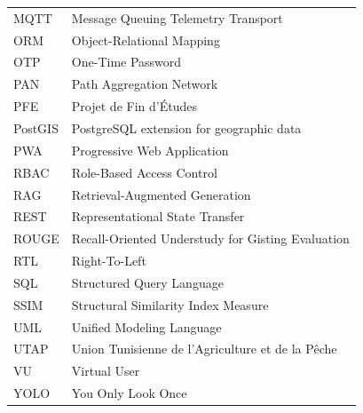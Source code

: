 \begin{longtable}{lp{10cm}}
MQTT & Message Queuing Telemetry Transport \\
ORM & Object-Relational Mapping \\
OTP & One-Time Password \\
PAN & Path Aggregation Network \\
PFE & Projet de Fin d'Études \\
PostGIS & PostgreSQL extension for geographic data \\
PWA & Progressive Web Application \\
RBAC & Role-Based Access Control \\
RAG & Retrieval-Augmented Generation \\
REST & Representational State Transfer \\
ROUGE & Recall-Oriented Understudy for Gisting Evaluation \\
RTL & Right-To-Left \\
SQL & Structured Query Language \\
SSIM & Structural Similarity Index Measure \\
UML & Unified Modeling Language \\
UTAP & Union Tunisienne de l'Agriculture et de la Pêche \\
VU & Virtual User \\
YOLO & You Only Look Once \\
\bottomrule
\end{longtable}
